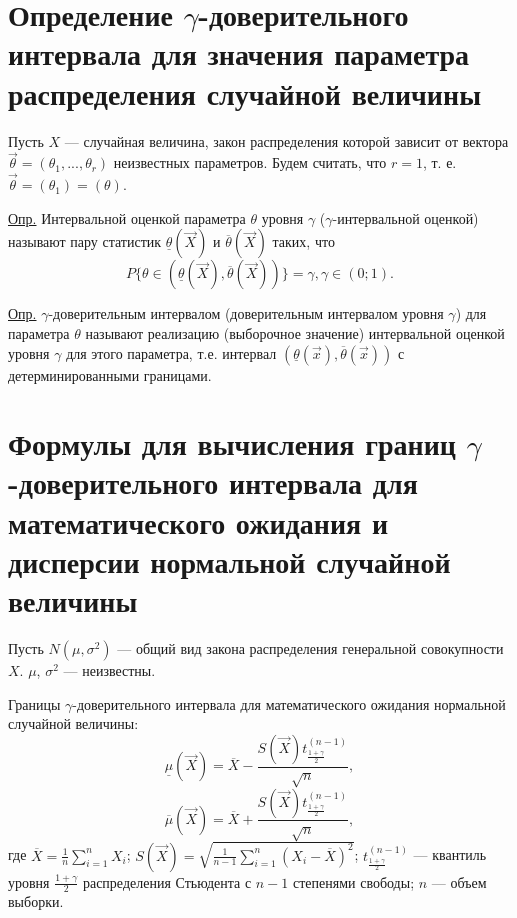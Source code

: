 \section{Определение $\gamma$-доверительного интервала для значения параметра распределения случайной величины}

Пусть $X$ --- случайная величина, закон распределения которой зависит от вектора $\vec \theta = (\theta_{1}, ..., \theta_{r})$ неизвестных параметров. Будем считать, что $r = 1$, т. е. $\vec \theta = (\theta_{1}) = (\theta)$.

\underline{Опр.} Интервальной оценкой параметра $\theta$ уровня $\gamma$ ($\gamma$-интервальной оценкой) называют пару статистик $\underline{\theta}(\vec X)$ и $\overline{\theta}(\vec X)$ таких, что
\begin{equation}
	P\{\theta \in (\underline{\theta}(\vec X), \overline{\theta}(\vec X))\} = \gamma, \gamma \in (0;1).
\end{equation}

\underline{Опр.} $\gamma$-доверительным интервалом (доверительным интервалом уровня $\gamma$) для параметра $\theta$ называют реализацию (выборочное значение) интервальной оценкой уровня $\gamma$ для этого параметра, т.е. интервал $(\underline{\theta}(\vec x), \overline{\theta}(\vec x))$ с детерминированными границами.

\section{Формулы для вычисления границ \newline$\gamma$-доверительного интервала для математического ожидания и дисперсии нормальной случайной величины}

Пусть $N(\mu, \sigma^2)$ --- общий вид закона распределения генеральной совокупности $X$. $\mu$, $\sigma^2$ --- неизвестны. 

Границы $\gamma$-доверительного интервала для математического ожидания нормальной случайной величины:
\begin{equation}
	\underline{\mu}(\vec X) = \overline{X} - \frac{S(\vec X)t^{(n - 1)}_{\frac{1 + \gamma}{2}}}{\sqrt{n}},
\end{equation}
\begin{equation}
	\overline{\mu}(\vec X) = \overline{X} + \frac{S(\vec X)t^{(n - 1)}_{\frac{1 + \gamma}{2}}}{\sqrt{n}},
\end{equation}
где $\overline{X} = \frac{1}{n} \sum_{i=1}^n X_i$; $S(\vec X) = \sqrt{\frac{1}{n-1} \sum_{i=1}^n (X_i - \overline X)^2}$; $t^{(n - 1)}_{\frac{1 + \gamma}{2}}$ --- квантиль уровня $\frac{1 + \gamma}{2}$ распределения Стьюдента с $n - 1$ степенями свободы; $n$ --- объем выборки.

